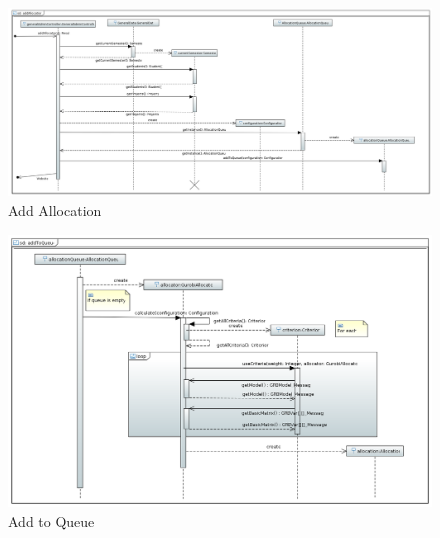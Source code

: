 \documentclass[parskip=full]{scrartcl}
\begin{document}
\begin{figure}
\centering
\includegraphics[width=\linewidth]{bilder/seqAddAllocation.png}
\caption{Add Allocation}
\label{seq:addAlloction}
\end{figure}

\begin{figure}
\centering
\includegraphics[width=\linewidth]{bilder/seqaddToQueue.png}
\caption{Add to Queue}
\label{seq:addToQueue}
\end{figure}
\end{document}

